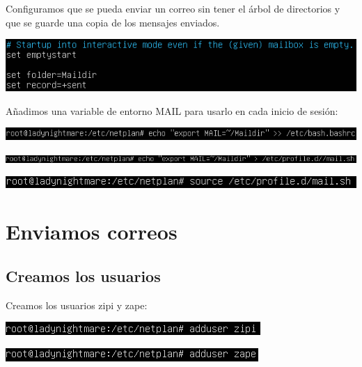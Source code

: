 \documentclass{article}
\begin{document}
Configuramos que se pueda enviar un correo sin tener el árbol de directorios y que se guarde una copia de los mensajes enviados.

\begin{center}
\includegraphics[scale=0.6]{images/emptystart.png}
\end{center}

Añadimos una variable de entorno MAIL para usarlo en cada inicio de sesión:

\begin{center}
\includegraphics[scale=0.6]{images/bash.png}
\end{center}

\begin{center}
\includegraphics[scale=0.6]{images/export.png}
\end{center}

\begin{center}
\includegraphics[scale=0.6]{images/source.png}
\end{center}

\section{Enviamos correos}

\subsection{Creamos los usuarios}

Creamos los usuarios zipi y zape:

\begin{center}
\includegraphics[scale=0.6]{images/zipi.png}
\end{center}

\begin{center}
\includegraphics[scale=0.6]{images/zape.png}
\end{center}
\end{document}
